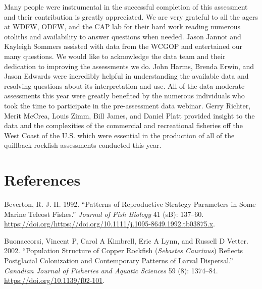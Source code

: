 \documentclass[11pt,
  english,
  a4paper,
]{article}
\begin{document}
\leavevmode\tagmcend\tagstructend


Many people were instrumental in the successful completion of this assessment and their contribution is greatly appreciated. We are very grateful to all the agers at WDFW, ODFW, and the CAP lab for their hard work reading numerous otoliths and availability to answer questions when needed. Jason Jannot and Kayleigh Sommers assisted with data from the WCGOP and entertained our many questions. We would like to acknowledge the data team and their dedication to improving the assessments we do. John Harms, Brenda Erwin, and Jason Edwards were incredibly helpful in understanding the available data and resolving questions about its interpretation and use. All of the data moderate assessments this year were greatly benefited by the numerous individuals who took the time to participate in the pre-assessment data webinar. Gerry Richter, Merit McCrea, Louis Zimm, Bill James, and Daniel Platt provided insight to the data and the complexities of the commercial and recreational fisheries off the West Coast of the U.S. which were essential in the production of all of the quillback rockfish assessments conducted this year.

\leavevmode\tagmcend\tagstructend\par

\clearpage


\hypertarget{references}{%
\section{References}\label{references}}

\leavevmode\tagmcend\tagstructend


\hypertarget{refs}{}
\leavevmode\hypertarget{ref-Beverton_1992}{}%
Beverton, R. J. H. 1992. ``Patterns of Reproductive Strategy Parameters in Some Marine Teleost Fishes.'' \emph{Journal of Fish Biology} 41 (sB): 137--60. \url{https://doi.org/https://doi.org/10.1111/j.1095-8649.1992.tb03875.x}.

\leavevmode\hypertarget{ref-buonaccorsi_population_2002}{}%
Buonaccorsi, Vincent P, Carol A Kimbrell, Eric A Lynn, and Russell D Vetter. 2002. ``Population Structure of Copper Rockfish (\emph{Sebastes Caurinus}) Reflects Postglacial Colonization and Contemporary Patterns of Larval Dispersal.'' \emph{Canadian Journal of Fisheries and Aquatic Sciences} 59 (8): 1374--84. \url{https://doi.org/10.1139/f02-101}.
\end{document}
